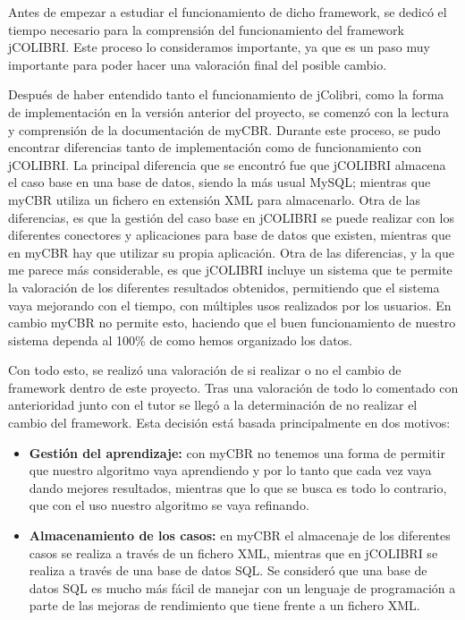 Antes de empezar a estudiar el funcionamiento de dicho framework, se dedicó el tiempo necesario para la comprensión del funcionamiento del framework jCOLIBRI. Este proceso lo consideramos importante, ya que es un paso muy importante para poder hacer una valoración final del posible cambio.

Después de haber entendido tanto el funcionamiento de jColibri, como la forma de implementación en la versión anterior del proyecto, se comenzó con la lectura y comprensión de la documentación de myCBR. Durante este proceso, se pudo encontrar diferencias tanto de implementación como de funcionamiento con jCOLIBRI. La principal diferencia que se encontró fue que jCOLIBRI almacena el caso base en una base de datos, siendo la más usual MySQL; mientras que myCBR utiliza un fichero en extensión XML para almacenarlo. Otra de las diferencias, es que la gestión del caso base en jCOLIBRI se puede realizar con los diferentes conectores y aplicaciones para base de datos que existen, mientras que en myCBR hay que utilizar su propia aplicación. Otra de las diferencias, y la que me parece más considerable, es que jCOLIBRI incluye un sistema que te permite la valoración de los diferentes resultados obtenidos, permitiendo que el sistema vaya mejorando con el tiempo, con múltiples usos realizados por los usuarios. En cambio myCBR no permite esto, haciendo que el buen funcionamiento de nuestro sistema dependa al 100\% de como hemos organizado los datos.

Con todo esto, se realizó una valoración de si realizar o no el cambio de framework dentro de este proyecto. Tras una valoración de todo lo comentado con anterioridad junto con el tutor se llegó a la determinación de no realizar el cambio del framework. Esta decisión está basada principalmente en dos motivos:

\begin{itemize}
	\tightlist
	\item
	\textbf{Gestión del aprendizaje:} con myCBR no tenemos una forma de permitir que nuestro algoritmo vaya aprendiendo y por lo tanto que cada vez vaya dando mejores resultados, mientras que lo que se busca es todo lo contrario, que con el uso nuestro algoritmo se vaya refinando.
	\item 
	\textbf{Almacenamiento de los casos:} en myCBR el almacenaje de los diferentes casos se realiza a través de un fichero XML, mientras que en jCOLIBRI se realiza a través de una base de datos SQL. Se consideró que una base de datos SQL es mucho más fácil de manejar con un lenguaje de programación a parte de las mejoras de rendimiento que tiene frente a un fichero XML.
\end{itemize}

